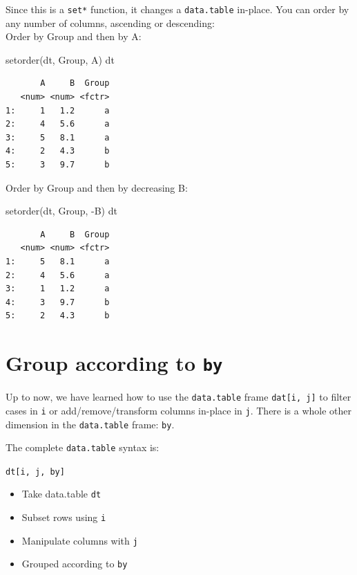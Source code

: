 \documentclass[
]{book}
\newenvironment{Shaded}{\begin{snugshade}}{\end{snugshade}}
\newcommand{\FunctionTok}[1]{\textcolor[rgb]{0.00,0.00,0.00}{#1}}
\newcommand{\NormalTok}[1]{#1}
\newcommand{\SpecialCharTok}[1]{\textcolor[rgb]{0.00,0.00,0.00}{#1}}
\providecommand{\tightlist}{%
  \setlength{\itemsep}{0pt}\setlength{\parskip}{0pt}}
\begin{document}
Since this is a \texttt{set*} function, it changes a \texttt{data.table} in-place. You can order by any number of columns, ascending or descending:\\
Order by Group and then by A:

\begin{Shaded}
\begin{Highlighting}[]
\FunctionTok{setorder}\NormalTok{(dt, Group, A)}
\NormalTok{dt}
\end{Highlighting}
\end{Shaded}

\begin{verbatim}
       A     B  Group
   <num> <num> <fctr>
1:     1   1.2      a
2:     4   5.6      a
3:     5   8.1      a
4:     2   4.3      b
5:     3   9.7      b
\end{verbatim}

Order by Group and then by decreasing B:

\begin{Shaded}
\begin{Highlighting}[]
\FunctionTok{setorder}\NormalTok{(dt, Group, }\SpecialCharTok{{-}}\NormalTok{B)}
\NormalTok{dt}
\end{Highlighting}
\end{Shaded}

\begin{verbatim}
       A     B  Group
   <num> <num> <fctr>
1:     5   8.1      a
2:     4   5.6      a
3:     1   1.2      a
4:     3   9.7      b
5:     2   4.3      b
\end{verbatim}

\hypertarget{group-according-to-by}{%
\section{\texorpdfstring{Group according to \texttt{by}}{Group according to by}}\label{group-according-to-by}}

Up to now, we have learned how to use the \texttt{data.table} frame \texttt{dat{[}i,\ j{]}} to filter cases in \texttt{i} or add/remove/transform columns in-place in \texttt{j}. There is a whole other dimension in the \texttt{data.table} frame: \texttt{by}.

\begin{rmdtip}
The complete \texttt{data.table} syntax is:

\texttt{dt{[}i,\ j,\ by{]}}

\begin{itemize}
\tightlist
\item
  Take data.table \texttt{dt}
\item
  Subset rows using \texttt{i}
\item
  Manipulate columns with \texttt{j}
\item
  Grouped according to \texttt{by}
\end{itemize}
\end{rmdtip}
\end{document}

